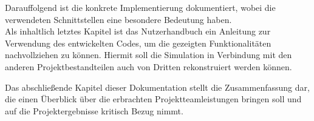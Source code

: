 	Darauffolgend ist die konkrete Implementierung dokumentiert, wobei die verwendeten Schnittstellen eine besondere Bedeutung haben.\\
	Als inhaltlich letztes Kapitel ist das Nutzerhandbuch ein Anleitung zur Verwendung des entwickelten Codes, um die gezeigten Funktionalitäten nachvollziehen zu können. Hiermit soll die Simulation in Verbindung mit den anderen Projektbestandteilen auch von Dritten rekonstruiert werden können.
	
	Das abschließende Kapitel dieser Dokumentation stellt die Zusammenfassung dar, die einen Überblick über die erbrachten Projektteamleistungen bringen soll und auf die Projektergebnisse kritisch Bezug nimmt.
	